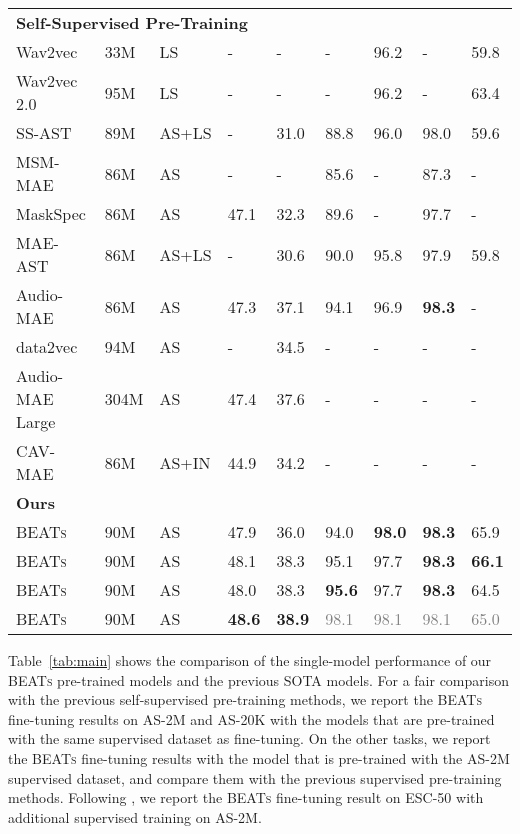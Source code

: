 \documentclass{article}
\theoremstyle{plain}
\theoremstyle{definition}
\theoremstyle{remark}
\newcommand\our{\textsc{BEATs}}
\begin{document}
\begin{table*}[t]
{\begin{tabular}{lllllllll}
         
         \hline
         \multicolumn{8}{l}{\textbf{{Self-Supervised Pre-Training}}} \\
         Wav2vec \citep{schneider2019wav2vec} & 33M & LS & - & - & - &  96.2 & - &  59.8 \\
         Wav2vec 2.0 \citep{baevski2020wav2vec} & 95M & LS & - & - & - &  96.2 & - &  63.4 \\
         SS-AST \citep{gong2022ssast} & 89M & AS+LS & - & 31.0 & 88.8 &  96.0 & 98.0 &  59.6 \\
         MSM-MAE \citep{niizumi2022masked} & 86M & AS & - & - &  85.6 &  - & 87.3 & - \\
         MaskSpec \citep{chong2022masked} & 86M & AS & 47.1 & 32.3 & 89.6 &  - & 97.7 & - \\
         MAE-AST \citep{baade2022mae} & 86M & AS+LS & - & 30.6 & 90.0 &  95.8 & 97.9 & 59.8 \\
         Audio-MAE \citep{xu2022masked} & 86M & AS & 47.3 & 37.1 & 94.1  &  96.9 & \textbf{98.3} & - \\
         data2vec \citep{baevski2022data2vec} & 94M & AS & - &  34.5 & - &  - & - & - \\
         Audio-MAE Large \citep{xu2022masked} & 304M & AS & 47.4 & 37.6 & - &  - & - & - \\
         CAV-MAE \citep{gong2022contrastive} & 86M & AS+IN & 44.9 & 34.2 & - &  - & - & - \\
         \hline
         \multicolumn{7}{l}{\textbf{{Ours}}} \\
         \our{} & 90M & AS & 47.9 & 36.0 & 94.0 &  \textbf{98.0} & \textbf{98.3} & 65.9 \\
         \our{} & 90M & AS & 48.1 & 38.3 & 95.1 &  97.7 & \textbf{98.3} & \textbf{66.1} \\
         \our{} & 90M & AS & 48.0 & 38.3 & \textbf{95.6} &  97.7 & \textbf{98.3} & 64.5 \\
        \our{} & 90M & AS & \textbf{48.6} & \textbf{38.9} & \textcolor{gray}{98.1} &  \textcolor{gray}{98.1} & \textcolor{gray}{98.1} & \textcolor{gray}{65.0} \\
        
         \bottomrule
       
    \end{tabular}
    }
\end{table*}

Table~\ref{tab:main} shows the comparison of the single-model performance of our \our{} pre-trained models and the previous SOTA models.
For a fair comparison with the previous self-supervised pre-training methods, we report the  \our{} fine-tuning results on AS-2M and AS-20K with the models that are pre-trained with the same supervised dataset as fine-tuning.
On the other tasks, we report the \our{} fine-tuning results with the model that is pre-trained with the AS-2M supervised dataset, and compare them with the previous supervised pre-training methods.
Following \citep{xu2022masked,gong2021ast}, we report the \our{} fine-tuning result on ESC-50 with additional supervised training on AS-2M.
\end{document}
